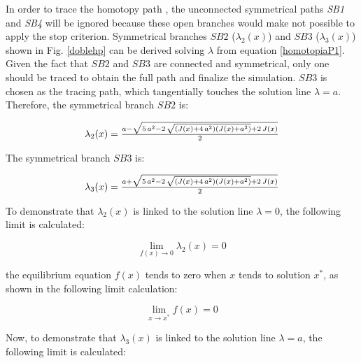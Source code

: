 \documentclass{elex}
\begin{document}
In order to trace the homotopy path \cite{homo_hk05}, the unconnected symmetrical paths {\it SB1} and {\it SB4} will be ignored because these open branches would make not possible to apply the stop criterion. Symmetrical branches $SB2$ ($\lambda_2(x)$) and $SB3$ ($\lambda_3(x)$) shown in Fig. \ref{doblehp} can be derived solving $\lambda$ from equation \ref{homotopiaP1}. Given the fact that $SB2$ and $SB3$ are connected and symmetrical, only one should be traced to obtain the full path and finalize the simulation. $SB3$ is chosen as the tracing path, which tangentially touches the solution line $\lambda=a$. Therefore, the symmetrical branch $SB2$ is:

\begin{equation}
{%
\begin{array}{l}
\lambda_2(x)= {{a-\sqrt {5\,{a}^{2}-2\,\sqrt { \left( J \left( x \right) +4
\,{a}^{2} \right)  \left( J \left( x \right) +{a}^{2} \right) }+2\,J
 \left( x \right) }} \over {2}}
\end{array}}
\label{sb2}
\end{equation}


The symmetrical branch $SB3$ is:

\begin{equation}
{%
\begin{array}{l}
\lambda_3(x)= {{a+\sqrt {5\,{a}^{2}-2\,\sqrt { \left( J \left( x \right) +4
\,{a}^{2} \right)  \left( J \left( x \right) +{a}^{2} \right) }+2\,J
 \left( x \right) }} \over {2}}
\end{array}}
\label{sb3}
\end{equation}

To demonstrate that $\lambda_2(x)$ is linked to the solution line $\lambda=0$, the following limit is calculated:

\begin{equation}
 \displaystyle\lim_{f(x) \to{0}}{\lambda_2(x)}=0 
 \label{demos1x}
\end{equation}

the equilibrium equation $f(x)$ tends to zero when $x$ tends to solution $x^*$, as shown in the following limit calculation:

\begin{equation}
 \displaystyle\lim_{x \to{x^*}}{f(x)}=0 
 \label{demos1x2}
\end{equation}

Now, to demonstrate that $\lambda_3(x)$ is linked to the solution line $\lambda=a$, the following limit is calculated:
\end{document}
